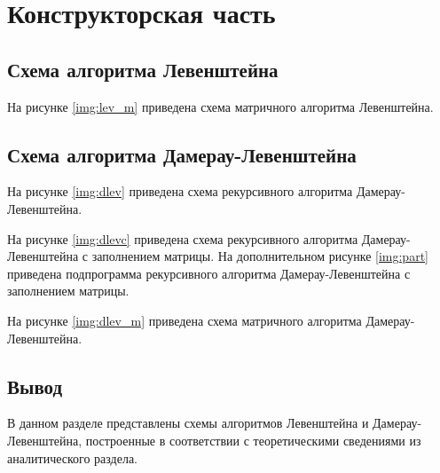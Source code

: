 \chapter{Конструкторская часть}

\section{Схема алгоритма Левенштейна}

На рисунке \ref{img:lev_m} приведена схема матричного алгоритма Левенштейна.

\section{Схема алгоритма Дамерау-Левенштейна}

На рисунке \ref{img:dlev} приведена схема рекурсивного алгоритма Дамерау-Левенштейна.

На рисунке \ref{img:dlevc} приведена схема рекурсивного алгоритма Дамерау-Левенштейна с заполнением матрицы. На дополнительном рисунке \ref{img:part} приведена подпрограмма рекурсивного алгоритма Дамерау-Левенштейна с заполнением матрицы.

На рисунке \ref{img:dlev_m} приведена схема матричного алгоритма Дамерау-Левенштейна.

\section*{Вывод}

В данном разделе представлены схемы алгоритмов Левенштейна и Дамерау-Левенштейна, построенные в соответствии с теоретическими сведениями из аналитического раздела.







